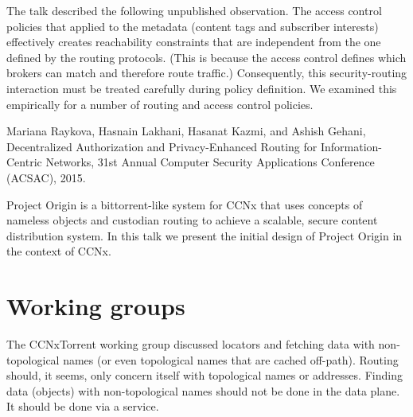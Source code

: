 \documentclass[a4paper,UKenglish]{dagrep}
\begin{document}
The talk described the following unpublished observation. The access control policies that applied to the metadata (content tags and subscriber interests) effectively creates reachability constraints that are independent from the one defined by the routing protocols. (This is because the access control defines which brokers can match and therefore route traffic.) Consequently, this security-routing interaction must be treated carefully during policy definition. We examined this empirically for a number of routing and access control policies.

\begin{thebibliography}{0}
 Mariana Raykova, Hasnain Lakhani, Hasanat Kazmi, and Ashish Gehani, Decentralized Authorization and Privacy-Enhanced Routing for Information-Centric Networks, 31st Annual Computer Security Applications Conference (ACSAC), 2015.
\end{thebibliography}

\license

Project Origin is a bittorrent-like system for CCNx that uses concepts of nameless objects and custodian routing to achieve a scalable, secure content distribution system. In this talk we present the initial design of Project Origin in the context of CCNx.

%



\section{Working groups}

\license

The CCNxTorrent working group discussed locators and fetching data with non-topological names (or even topological names that are cached off-path). Routing should, it seems, only concern itself with topological names or addresses.  Finding data (objects) with non-topological names should not be done in the data plane.  It should be done via a service. 
 
\end{document}
